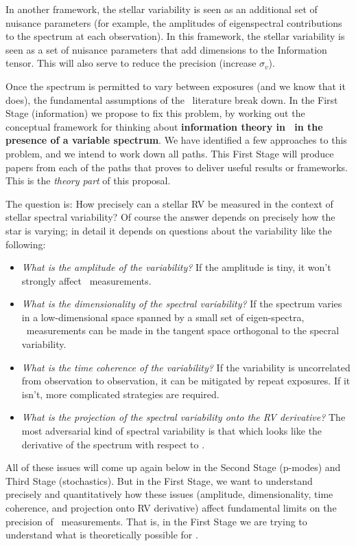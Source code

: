 \documentclass[12pt, letterpaper]{article}
\begin{document}
{In another framework, the stellar variability is seen as an additional set of
nuisance parameters (for example, the amplitudes of eigenspectral contributions
to the spectrum at each observation).
In this framework, the stellar variability is seen as a set of nuisance parameters
that add dimensions to the Information tensor.
This will also serve to reduce the precision (increase $\sigma_v$).
}

Once the spectrum is permitted to vary between exposures (and we know that
it does), the fundamental assumptions of the \EPRV\ literature break down.
In the First Stage (information) we propose to fix this problem, by
working out the conceptual framework for thinking about
\textbf{information theory in \EPRV\ in the presence of a variable
  spectrum}.
We have identified a few approaches to this problem, and we intend to
work down all paths.
This First Stage will produce papers from each of the paths that proves
to deliver useful results or frameworks.
This is the \emph{theory part} of this proposal.

The question is: How precisely can a stellar RV be measured in the context
of stellar spectral variability?
Of course the answer depends on precisely how the star is varying;
in detail it depends on questions about the variability like the following:
\begin{itemize}
\item
\emph{What is the amplitude of the variability?}
If the amplitude is tiny, it won't strongly affect \RV\ measurements.
\item
\emph{What is the dimensionality of the spectral variability?}
If the spectrum varies in a low-dimensional space spanned by a small set
of eigen-spectra, \EPRV\ measurements can be made in the tangent space
orthogonal to the specral variability.
\item
\emph{What is the time coherence of the variability?}
If the variability is uncorrelated from observation to observation, it
can be mitigated by repeat exposures. If it isn't, more complicated
strategies are required.
\item
\emph{What is the projection of the spectral variability onto the RV derivative?}
The most adversarial kind of spectral variability is that which looks
like the derivative of the spectrum with respect to \RV.
\end{itemize}

\noindent
All of these issues will come up again below in the Second Stage (p-modes)
and Third Stage (stochastics).
But in the First Stage, we want to understand precisely and quantitatively
how these issues (amplitude, dimensionality, time coherence, and projection
onto RV derivative) affect fundamental limits on the precision of
\EPRV\ measurements.
That is, in the First Stage we are trying to understand what is theoretically
possible for \EPRV.
\end{document}
